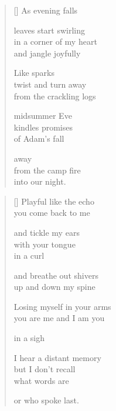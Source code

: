 \documentclass[14pt]{extbook}
\newcommand*{\centeredornament}{\centerline{\pgfornament[width=6cm]{88}}}
\begin{document}

\settowidth{\versewidth}{in a corner of my heart}

\begin{verse}[\versewidth]
  As evening falls

  leaves start swirling \\
  in a corner of my heart \\
  and jangle joyfully

  Like sparks \\
  twist and turn away \\
  from the crackling logs

  midsummer Eve \\
  kindles promises \\
  of Adam's fall

  away \\
  from the camp fire \\
  into our night.
\end{verse}


\newpage

\vspace*{-15mm}
\centeredornament
\vspace*{-7mm}


\settowidth{\versewidth}{Losing myself in your arms}

\begin{verse}[\versewidth]
  Playful like the echo \\
  you come back to me

  and tickle my ears \\
  with your tongue \\
  in a curl

  and breathe out shivers \\
  up and down my spine

  Losing myself in your arms \\
  you are me and I am you

  in a sigh

  I hear a distant memory \\
  but I don't recall \\
  what words are

  or who spoke last.
\end{verse}

\end{document}

